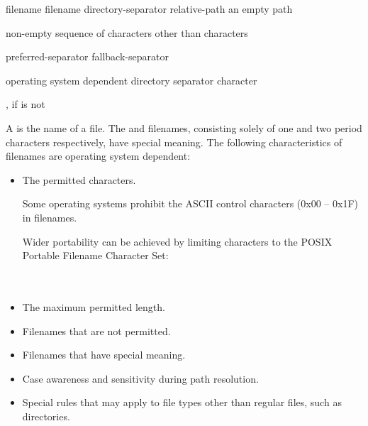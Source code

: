 \begin{ncbnf}
\br
    filename\br
    filename directory-separator relative-path\br
    \textnormal{an empty path}
\end{ncbnf}

\begin{ncbnf}
\br
    \textnormal{non-empty sequence of characters other than  characters}
\end{ncbnf}

\begin{ncbnf}
\br
    preferred-separator \br
    fallback-separator 
\end{ncbnf}

\begin{ncbnf}
\br
    \textnormal{operating system dependent directory separator character}
\end{ncbnf}

\begin{ncbnf}
\br
    \textnormal{\tcode{/}, if  is not \tcode{/}}
\end{ncbnf}

\pnum
A  is
the name of a file. The  and  filenames,
consisting solely of one and two period characters respectively,
have special meaning.
The following characteristics of filenames are operating system dependent:
\begin{itemize}
\item The permitted characters.
\begin{example}
Some operating systems prohibit
      the ASCII control characters (0x00 -- 0x1F) in filenames.
\end{example}
\begin{note}
Wider portability can be achieved by limiting 
characters to the POSIX Portable Filename Character Set: \\
 \\
 \\
\end{note}
\item The maximum permitted length.
\item Filenames that are not permitted.
\item Filenames that have special meaning.
\item Case awareness and sensitivity during path resolution.
\item Special rules that may apply to file types other than regular
  files, such as directories.
\end{itemize}

